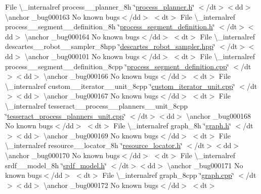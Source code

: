 \begin{DoxyRefList}
\+File \textbackslash{}\+\_\+internalref process\+\_\+\+\_\+planner\+\_\+8h \char`\"{}\mbox{\hyperlink{process__planner_8h}{process\+\_\+planner.\+h}}\char`\"{} $<$/dt$>$$<$dd$>$ \textbackslash{}anchor \+\_\+bug000163 No known bugs$<$/dd$>$ $<$dt$>$
\+File \textbackslash{}\+\_\+internalref process\+\_\+\+\_\+segment\+\_\+\+\_\+definition\+\_\+8h \char`\"{}\mbox{\hyperlink{process__segment__definition_8h}{process\+\_\+segment\+\_\+definition.\+h}}\char`\"{} $<$/dt$>$$<$dd$>$ \textbackslash{}anchor \+\_\+bug000164 No known bugs$<$/dd$>$ $<$dt$>$
\+File \textbackslash{}\+\_\+internalref descartes\+\_\+\+\_\+robot\+\_\+\+\_\+sampler\+\_\+8hpp \char`\"{}\mbox{\hyperlink{descartes__robot__sampler_8hpp}{descartes\+\_\+robot\+\_\+sampler.\+hpp}}\char`\"{} $<$/dt$>$$<$dd$>$ \textbackslash{}anchor \+\_\+bug000101 No known bugs$<$/dd$>$ $<$dt$>$
\+File \textbackslash{}\+\_\+internalref process\+\_\+\+\_\+segment\+\_\+\+\_\+definition\+\_\+8cpp \char`\"{}\mbox{\hyperlink{process__segment__definition_8cpp}{process\+\_\+segment\+\_\+definition.\+cpp}}\char`\"{} $<$/dt$>$$<$dd$>$ \textbackslash{}anchor \+\_\+bug000166 No known bugs$<$/dd$>$ $<$dt$>$
\+File \textbackslash{}\+\_\+internalref custom\+\_\+\+\_\+iterator\+\_\+\+\_\+unit\+\_\+8cpp \char`\"{}\mbox{\hyperlink{custom__iterator__unit_8cpp}{custom\+\_\+iterator\+\_\+unit.\+cpp}}\char`\"{} $<$/dt$>$$<$dd$>$ \textbackslash{}anchor \+\_\+bug000167 No known bugs$<$/dd$>$ $<$dt$>$
\+File \textbackslash{}\+\_\+internalref tesseract\+\_\+\+\_\+process\+\_\+\+\_\+planners\+\_\+\+\_\+unit\+\_\+8cpp \char`\"{}\mbox{\hyperlink{tesseract__process__planners__unit_8cpp}{tesseract\+\_\+process\+\_\+planners\+\_\+unit.\+cpp}}\char`\"{} $<$/dt$>$$<$dd$>$ \textbackslash{}anchor \+\_\+bug000168 No known bugs$<$/dd$>$ $<$dt$>$
\+File \textbackslash{}\+\_\+internalref graph\+\_\+8h \char`\"{}\mbox{\hyperlink{graph_8h}{graph.\+h}}\char`\"{} $<$/dt$>$$<$dd$>$ \textbackslash{}anchor \+\_\+bug000169 No known bugs$<$/dd$>$ $<$dt$>$
\+File \textbackslash{}\+\_\+internalref resource\+\_\+\+\_\+locator\+\_\+8h \char`\"{}\mbox{\hyperlink{resource__locator_8h}{resource\+\_\+locator.\+h}}\char`\"{} $<$/dt$>$$<$dd$>$ \textbackslash{}anchor \+\_\+bug000170 No known bugs$<$/dd$>$ $<$dt$>$
\+File \textbackslash{}\+\_\+internalref srdf\+\_\+\+\_\+model\+\_\+8h \char`\"{}\mbox{\hyperlink{srdf__model_8h}{srdf\+\_\+model.\+h}}\char`\"{} $<$/dt$>$$<$dd$>$ \textbackslash{}anchor \+\_\+bug000171 No known bugs$<$/dd$>$ $<$dt$>$
\+File \textbackslash{}\+\_\+internalref graph\+\_\+8cpp \char`\"{}\mbox{\hyperlink{graph_8cpp}{graph.\+cpp}}\char`\"{} $<$/dt$>$$<$dd$>$ \textbackslash{}anchor \+\_\+bug000172 No known bugs$<$/dd$>$ $<$dt$>$

\end{DoxyRefList}
